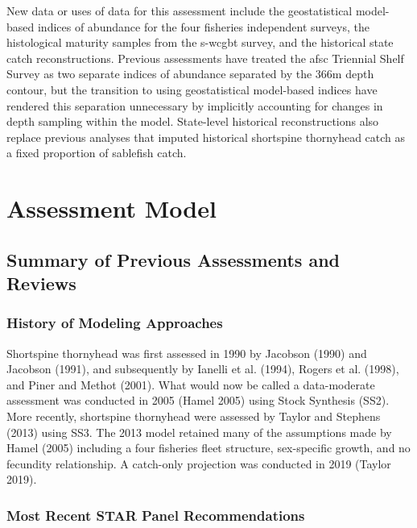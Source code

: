 \documentclass[11pt,
  english,
  letterpaper,
]{article}
\begin{document}
New data or uses of data for this assessment include the geostatistical model-based indices of abundance for the four fisheries independent surveys, the histological maturity samples from the \gls {s-wcgbt} survey, and the historical state catch reconstructions. Previous assessments have treated the \gls{afsc} Triennial Shelf Survey as two separate indices of abundance separated by the 366m depth contour, but the transition to using geostatistical model-based indices have rendered this separation unnecessary by implicitly accounting for changes in depth sampling within the model. State-level historical reconstructions also replace previous analyses that imputed historical shortspine thornyhead catch as a fixed proportion of sablefish catch.

\hypertarget{assessment-model}{%
\section{Assessment Model}\label{assessment-model}}

\hypertarget{summary-of-previous-assessments-and-reviews}{%
\subsection{Summary of Previous Assessments and Reviews}\label{summary-of-previous-assessments-and-reviews}}

\hypertarget{history-of-modeling-approaches}{%
\subsubsection{History of Modeling Approaches}\label{history-of-modeling-approaches}}

Shortspine thornyhead was first assessed in 1990 by Jacobson (1990) and Jacobson (1991), and subsequently by Ianelli et al. (1994), Rogers et al. (1998), and Piner and Methot (2001). What would now be called a data-moderate assessment was conducted in 2005 (Hamel 2005) using Stock Synthesis (SS2). More recently, shortspine thornyhead were assessed by Taylor and Stephens (2013) using SS3. The 2013 model retained many of the assumptions made by Hamel (2005) including a four fisheries fleet structure, sex-specific growth, and no fecundity relationship. A catch-only projection was conducted in 2019 (Taylor 2019).

\hypertarget{most-recent-star-panel-recommendations}{%
\subsubsection{Most Recent STAR Panel Recommendations}\label{most-recent-star-panel-recommendations}}
\end{document}
